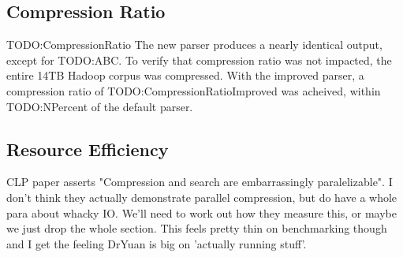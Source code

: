 \documentclass[letterpaper,twocolumn,10pt]{article}
\begin{document}

\subsection{Compression Ratio}

TODO:CompressionRatio The new parser produces a nearly identical output, except for TODO:ABC. To verify that compression ratio was not impacted, the entire 14TB Hadoop corpus was compressed. With the improved parser, a compression ratio of TODO:CompressionRatioImproved was acheived, within TODO:NPercent of the default parser.

\subsection{Resource Efficiency}

CLP paper asserts "Compression and search are embarrassingly paralelizable". I don't think they actually demonstrate parallel compression, but do have a whole para about whacky IO. We'll need to work out how they measure this, or maybe we just drop the whole section. This feels pretty thin on benchmarking though and I get the feeling DrYuan is big on 'actually running stuff'.



\end{document}
